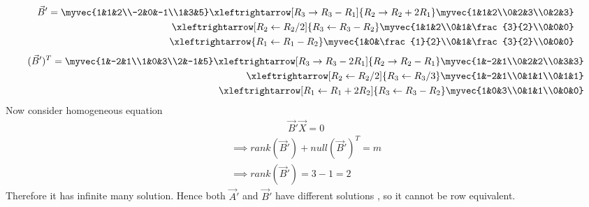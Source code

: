 \documentclass[journal,12pt,twocolumn]{IEEEtran}
\begin{document}
    \begin{align}
     \vec{B}{'}=\myvec{1&1&2\\-2&0&-1\\1&3&5}
     \xleftrightarrow[R_3\rightarrow R_3-R_1]{R_2\rightarrow R_2+2R_1}\myvec{1&1&2\\0&2&3\\0&2&3}\\
     \xleftrightarrow[R_2\leftarrow R_2/2]{R_3\leftarrow R_3-R_2}
     \myvec{1&1&2\\0&1&\frac{3}{2}\\0&0&0}\\
     \xleftrightarrow{R_1\leftarrow R_1-R_2} \myvec{1&0&\frac{1}{2}\\0&1&\frac{3}{2}\\0&0&0}
 \end{align}
  \begin{align}
     (\vec{B}{'})^{T}=\myvec{1&-2&1\\1&0&3\\2&-1&5}
     \xleftrightarrow[R_3\rightarrow R_3-2R_1]{R_2\rightarrow R_2-R_1}\myvec{1&-2&1\\0&2&2\\0&3&3}\\
     \xleftrightarrow[R_2\leftarrow R_2/2]{R_3\leftarrow R_3/3}
     \myvec{1&-2&1\\0&1&1\\0&1&1}\\
     \xleftrightarrow[R_1\leftarrow R_1+2R_2]{R_3\leftarrow R_3-R_2} \myvec{1&0&3\\0&1&1\\0&0&0}
 \end{align}
  Now consider homogeneous equation 
 \begin{align}
   \vec{B}{'}\vec{X}=0
   \end{align}
   \begin{align}
   \implies rank(\vec{B}{'})+null(\vec{B}{'})^{T}=m\\
   \implies rank(\vec{B}{'}) = 3-1 = 2
   \end{align}
   Therefore it has infinite many solution.
   Hence both $\vec{A}{'}$ and $\vec{B}{'}$ have different solutions , so it cannot be row equivalent.  
 
\end{document}
